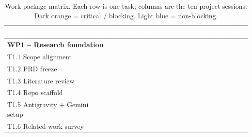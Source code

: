 \documentclass[11pt, a4paper, oneside, openany]{report}
\begin{document}
\begin{table}[H]
\centering\scriptsize
\caption{Work-package matrix. Each row is one task; columns are the ten project sessions. Dark orange = critical / blocking. Light blue = non-blocking.}
\label{tab:wpmatrix}
\renewcommand{\arraystretch}{1.2}
\begin{tabular}{|p{4.0cm}|c|c|c|c|c|c|c|c|c|c|}
\hline
\rowcolor{headbg!90}\textcolor{white}{\textbf{Task}}
 & \textcolor{white}{\textbf{S1}} & \textcolor{white}{\textbf{S2}} & \textcolor{white}{\textbf{S3}} & \textcolor{white}{\textbf{S4}}
 & \textcolor{white}{\textbf{S5}} & \textcolor{white}{\textbf{S6}} & \textcolor{white}{\textbf{S7}} & \textcolor{white}{\textbf{S8}}
 & \textcolor{white}{\textbf{S9}} & \textcolor{white}{\textbf{S10}} \\
\hline
\multicolumn{11}{|l|}{\textbf{WP1 -- Research foundation}} \\
\hline
T1.1 Scope alignment            & \cellcolor{wpcrit} &                    &                    &                    &                    &                    &                    &                    &                    &                    \\
T1.2 PRD freeze                 & \cellcolor{wpcrit} & \cellcolor{wpcrit} &                    &                    &                    &                    &                    &                    &                    &                    \\
T1.3 Literature review          & \cellcolor{wplight}& \cellcolor{wplight}&                    &                    &                    &                    &                    &                    &                    &                    \\
T1.4 Repo scaffold              & \cellcolor{wpcrit} &                    &                    &                    &                    &                    &                    &                    &                    &                    \\
T1.5 Antigravity + Gemini setup & \cellcolor{wpcrit} &                    &                    &                    &                    &                    &                    &                    &                    &                    \\
T1.6 Related-work survey        & \cellcolor{wplight}& \cellcolor{wplight}&                    &                    &                    &                    &                    &                    &                    &                    \\

\end{tabular}
\end{table}
\end{document}
